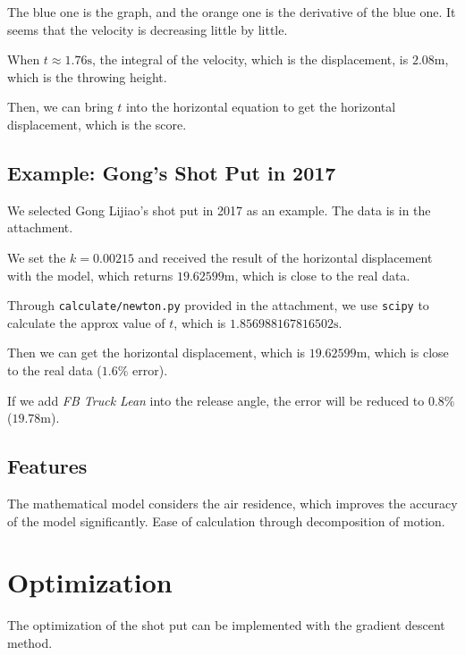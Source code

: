 \documentclass{article}
\begin{document}
The blue one is the graph, and the orange one is the derivative of the blue one. It seems that the velocity is decreasing little by little.

When $t \approx 1.76 \si{\second}$, the integral of the velocity, which is the displacement, is $2.08 \si{\meter}$, which is the throwing height.

Then, we can bring $t$ into the horizontal equation to get the horizontal displacement, which is the score.

\subsection{Example: Gong's Shot Put in 2017}

\label{subsection:model-example}

We selected Gong Lijiao's shot put in 2017 as an example. The data is in the attachment.

We set the $k = 0.00215$ and received the result of the horizontal displacement with the model, which returns $19.62599 \si{\meter}$, which is close to the real data.

Through \texttt{calculate/newton.py} provided in the attachment, we use \texttt{scipy} to calculate the approx value of $t$, which is $1.856988167816502 \si{\second}$.

Then we can get the horizontal displacement, which is $19.62599 \si{\meter}$, which is close to the real data ($1.6\%$ error).

If we add \textit{FB Truck Lean} into the release angle, the error will be reduced to $0.8\%$ ($19.78 \si{\meter}$).

\subsection{Features}

\label{subsection:model-features}

The mathematical model considers the air residence, which improves the accuracy of the model significantly. Ease of calculation through decomposition of motion.

\section{Optimization}

\label{section:optimization}

The optimization of the shot put can be implemented with the gradient descent method.
\end{document}
